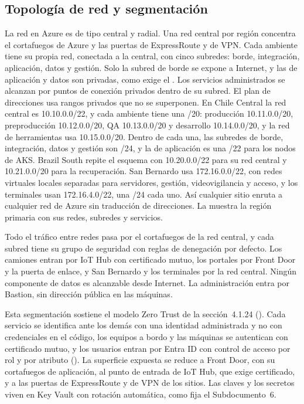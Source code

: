 \subsection{Topología de red y segmentación}\label{sec:4-red}

La red en Azure es de tipo central y radial. Una red central por región concentra el cortafuegos de
Azure y las puertas de ExpressRoute y de VPN. Cada ambiente tiene su propia red, conectada a la
central, con cinco subredes: borde, integración, aplicación, datos y gestión. Solo la subred de borde se
expone a Internet, y las de aplicación y datos son privadas, como exige el . Los servicios
administrados se alcanzan por puntos de conexión privados dentro de su subred. El plan de direcciones usa rangos privados que no se
superponen. En Chile Central la red central es 10.10.0.0/22, y cada ambiente tiene una /20: producción
10.11.0.0/20, preproducción 10.12.0.0/20, QA 10.13.0.0/20 y desarrollo 10.14.0.0/20, y la red de
herramientas usa 10.15.0.0/20. Dentro de cada
una, las subredes de borde, integración, datos y gestión son /24, y la de aplicación es una /22 para
los nodos de AKS. Brazil South repite el esquema con 10.20.0.0/22 para su red central y 10.21.0.0/20
para la recuperación. San Bernardo usa 172.16.0.0/22, con redes virtuales locales separadas para
servidores, gestión, videovigilancia y acceso, y los terminales usan 172.16.4.0/22, una /24 cada uno.
Así cualquier sitio enruta a cualquier red de Azure sin traducción de direcciones. La  muestra la región primaria con sus redes, subredes y
servicios.


Todo el tráfico entre redes pasa por el cortafuegos de la red central, y cada subred tiene su grupo de
seguridad con reglas de denegación por defecto. Los camiones entran por IoT Hub con certificado mutuo,
los portales por Front Door y la puerta de enlace, y San Bernardo y los terminales por la red central.
Ningún componente de datos es alcanzable desde Internet. La administración entra por Bastion, sin
dirección pública en las máquinas.

Esta segmentación sostiene el modelo Zero Trust de la sección~4.1.24 (). Cada servicio se identifica ante
los demás con una identidad administrada y no con credenciales en el código, los equipos a bordo y las
máquinas se autentican con certificado mutuo, y los usuarios entran por Entra ID con control de acceso
por rol y por atributo (). La superficie expuesta se reduce a Front Door, con su
cortafuegos de aplicación, al punto de entrada de IoT Hub, que exige certificado, y a las puertas de
ExpressRoute y de VPN de los sitios. Las claves y los secretos viven en Key Vault con rotación
automática, como fija el Subdocumento~6.

